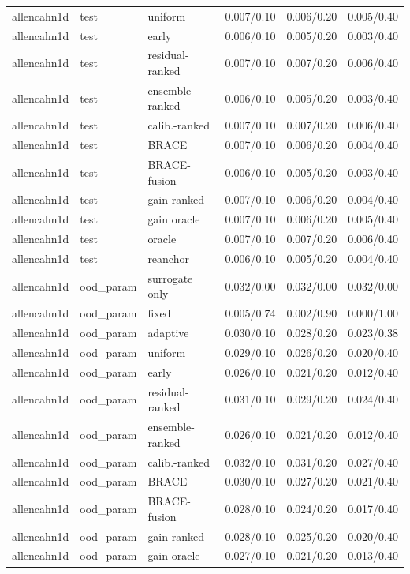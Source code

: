 \begin{tabular}{lllrrr}
allencahn1d & test & uniform & 0.007/0.10 & 0.006/0.20 & 0.005/0.40 \\
allencahn1d & test & early & 0.006/0.10 & 0.005/0.20 & 0.003/0.40 \\
allencahn1d & test & residual-ranked & 0.007/0.10 & 0.007/0.20 & 0.006/0.40 \\
allencahn1d & test & ensemble-ranked & 0.006/0.10 & 0.005/0.20 & 0.003/0.40 \\
allencahn1d & test & calib.-ranked & 0.007/0.10 & 0.007/0.20 & 0.006/0.40 \\
allencahn1d & test & BRACE & 0.007/0.10 & 0.006/0.20 & 0.004/0.40 \\
allencahn1d & test & BRACE-fusion & 0.006/0.10 & 0.005/0.20 & 0.003/0.40 \\
allencahn1d & test & gain-ranked & 0.007/0.10 & 0.006/0.20 & 0.004/0.40 \\
allencahn1d & test & gain oracle & 0.007/0.10 & 0.006/0.20 & 0.005/0.40 \\
allencahn1d & test & oracle & 0.007/0.10 & 0.007/0.20 & 0.006/0.40 \\
allencahn1d & test & reanchor & 0.006/0.10 & 0.005/0.20 & 0.004/0.40 \\
\midrule
allencahn1d & ood\_param & surrogate only & 0.032/0.00 & 0.032/0.00 & 0.032/0.00 \\
allencahn1d & ood\_param & fixed & 0.005/0.74 & 0.002/0.90 & 0.000/1.00 \\
allencahn1d & ood\_param & adaptive & 0.030/0.10 & 0.028/0.20 & 0.023/0.38 \\
allencahn1d & ood\_param & uniform & 0.029/0.10 & 0.026/0.20 & 0.020/0.40 \\
allencahn1d & ood\_param & early & 0.026/0.10 & 0.021/0.20 & 0.012/0.40 \\
allencahn1d & ood\_param & residual-ranked & 0.031/0.10 & 0.029/0.20 & 0.024/0.40 \\
allencahn1d & ood\_param & ensemble-ranked & 0.026/0.10 & 0.021/0.20 & 0.012/0.40 \\
allencahn1d & ood\_param & calib.-ranked & 0.032/0.10 & 0.031/0.20 & 0.027/0.40 \\
allencahn1d & ood\_param & BRACE & 0.030/0.10 & 0.027/0.20 & 0.021/0.40 \\
allencahn1d & ood\_param & BRACE-fusion & 0.028/0.10 & 0.024/0.20 & 0.017/0.40 \\
allencahn1d & ood\_param & gain-ranked & 0.028/0.10 & 0.025/0.20 & 0.020/0.40 \\
allencahn1d & ood\_param & gain oracle & 0.027/0.10 & 0.021/0.20 & 0.013/0.40 \\

\end{tabular}
